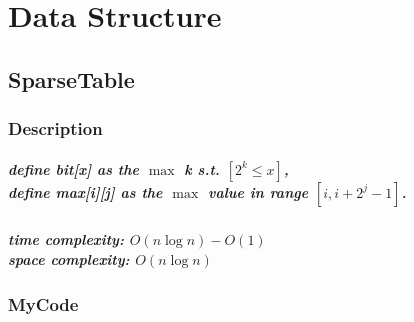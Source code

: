 \chapter{Data Structure}

\section{SparseTable}

\subsection{Description}

\paragraph{define bit[x] as the $\max$ k s.t. $[2^k \le x]$,\\define max[i][j] as the $\max$ value in range $[i,i+2^j-1]$.}

\paragraph{time complexity: $O(n\log{n}) - O(1)$\\space complexity: $O(n\log{n})$}

\subsection{MyCode}

\inputminted{cpp}{\source/data-structure/sparse-table/sparse-table.cpp}
